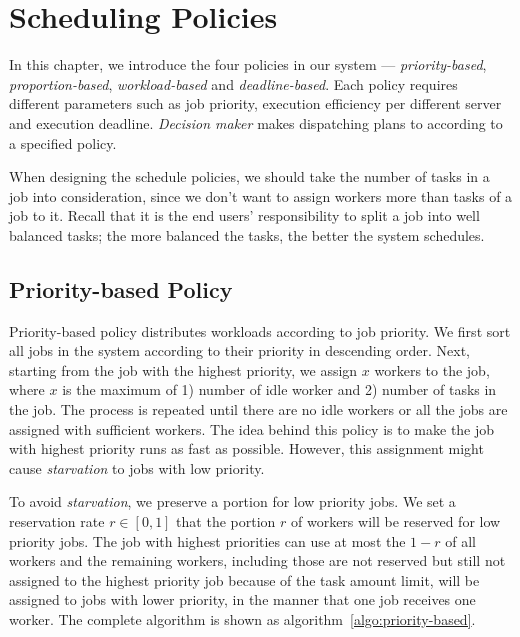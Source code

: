 \chapter{Scheduling Policies}\label{sec:policy}

In this chapter, we introduce the four policies in our system ---
\emph{priority-based}, \emph{proportion-based}, \emph{workload-based}
and \emph{deadline-based}.
Each policy requires different parameters such as job priority,
execution efficiency per different server and execution deadline.
\emph{Decision maker} makes dispatching plans to according to a
specified policy.

When designing the schedule policies, we should take the number of tasks
in a job into consideration, since we don't want to assign workers more
than tasks of a job to it.
Recall that it is the end users' responsibility to split a job into well
balanced tasks; the more balanced the tasks, the better the system
schedules.


\section{Priority-based Policy}

Priority-based policy distributes workloads according to job priority. 
We first sort all jobs in the system according to their priority in 
descending order.
Next, starting from the job with the highest priority, we assign $x$
workers to the job, where $x$ is the maximum of 1) number of idle worker
and 2) number of tasks in the job.
The process is repeated until there are no idle workers or all the jobs
are assigned with sufficient workers.
The idea behind this policy is to make the job with highest priority 
runs as fast as possible.
However, this assignment might cause \emph{starvation} to jobs with 
low priority.

To avoid \emph{starvation}, we preserve a portion for low priority jobs.
We set a reservation rate $r \in [0,1]$ that the portion $r$ of workers
will be reserved for low priority jobs.
The job with highest priorities can use at most the $1-r$ of all workers
and the remaining workers, including those are not reserved but still not
assigned to the highest priority job because of the task amount limit,
will be assigned to jobs with lower priority, in the manner that one job
receives one worker.
The complete algorithm is shown as algorithm~\ref{algo:priority-based}.

